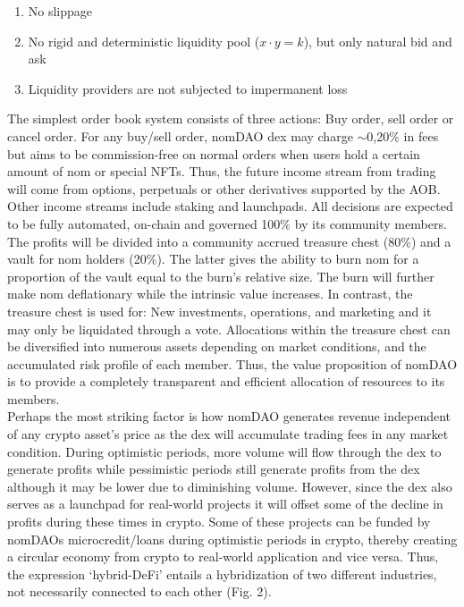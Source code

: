 \documentclass[12pt]{article}
\begin{document}
\begin{enumerate}

\item No slippage

\item No rigid and deterministic liquidity pool ($x \cdot y = k$), but only natural bid and ask

\item Liquidity providers are not subjected to impermanent loss\cite{il}

\end{enumerate}

The simplest order book system consists of three actions: Buy order, sell order or cancel order. For any buy/sell order, nomDAO dex may charge $\sim$0,20$\%$ in fees but aims to be commission-free on normal orders when users hold a certain amount of nom or special NFTs. Thus, the future income stream from trading will come from options, perpetuals or other derivatives supported by the AOB. Other income streams include staking and launchpads. All decisions are expected to be fully automated, on-chain and governed 100$\%$ by its community members. The profits will be divided into a community accrued treasure chest (80$\%$) and a vault for nom holders (20$\%$). The latter gives the ability to burn \cite{burn} nom for a proportion of the vault equal to the burn's relative size. The burn will further make nom deflationary while the intrinsic value increases. In contrast, the treasure chest is used for: New investments, operations, and marketing and it may only be liquidated through a vote. Allocations within the treasure chest can be diversified into numerous assets depending on market conditions, and the accumulated risk profile of each member. Thus, the value proposition of nomDAO is to provide a completely transparent and efficient allocation of resources to its members. \\

Perhaps the most striking factor is how nomDAO generates revenue independent of any crypto asset's price as the dex will accumulate trading fees in any market condition. During optimistic periods, more volume will flow through the dex to generate profits while pessimistic periods still generate profits from the dex although it may be lower due to diminishing volume. However, since the dex also serves as a launchpad for real-world projects it will offset some of the decline in profits during these times in crypto. Some of these projects can be funded by nomDAOs microcredit/loans during optimistic periods in crypto, thereby creating a circular economy from crypto to real-world application and vice versa. Thus, the expression ‘hybrid-DeFi’ entails a hybridization of two different industries, not necessarily connected to each other (Fig. 2). 
\end{document}

